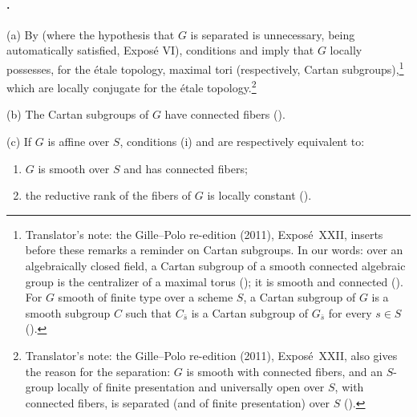 \paragraph{.}
\textup{(a)} By  \textup{(where the hypothesis that
\(G\) is separated is unnecessary, being automatically satisfied,
Exposé VI)}, conditions
\textup{} and \textup{} imply that \(G\) locally possesses,
for the étale topology, maximal tori \textup{(respectively, Cartan
subgroups)},\footnote{Translator's note: the Gille--Polo re-edition (2011), Exposé~XXII, inserts
before these remarks a reminder on Cartan subgroups. In our words: over an
algebraically closed field, a Cartan subgroup of a smooth connected algebraic
group is the centralizer of a maximal torus (); it is smooth
and connected (). For \(G\) smooth of finite type over a
scheme \(S\), a Cartan subgroup of \(G\) is a smooth subgroup \(C\) such that
\(C_{\bar s}\) is a Cartan subgroup of \(G_{\bar s}\) for every \(s\in S\)
().} which are locally conjugate for the étale topology.\footnote{Translator's note: the Gille--Polo re-edition (2011), Exposé~XXII,
also gives the reason for the separation: \(G\) is smooth with connected fibers,
and an \(S\)-group locally of finite presentation and universally open over
\(S\), with connected fibers, is separated (and of finite presentation) over
\(S\) ().}

\textup{(b)} The Cartan subgroups of \(G\) have connected fibers
\textup{()}.

\textup{(c)} If \(G\) is affine over \(S\), conditions
\textup{(i)} and \textup{} are respectively equivalent to:
\begin{enumerate}
\item[\textup{(i$'$)}]
\(G\) is smooth over \(S\) and has connected fibers;

\item[\textup{(ii$'$)}]
the reductive rank of the fibers of \(G\) is locally constant
\textup{()}.
\end{enumerate}

